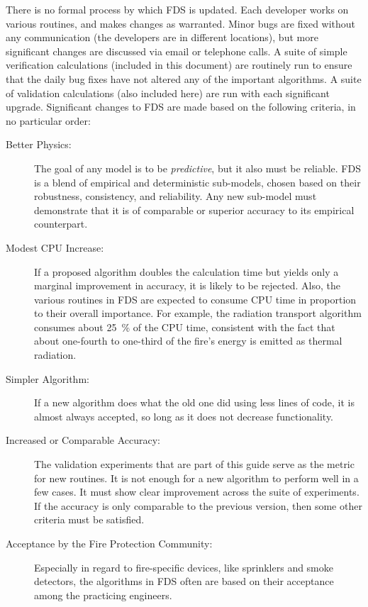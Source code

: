 \documentclass[11pt]{book}
\begin{document}
There is no formal process by which FDS is updated. Each developer
works on various routines, and makes changes as warranted. Minor bugs
are fixed without any communication (the developers are in different
locations), but more significant changes are discussed via email or
telephone calls. A suite of simple verification calculations (included
in this document) are routinely run to ensure that the daily bug fixes
have not altered any of the important algorithms. A suite of
validation calculations (also included here) are run with each
significant upgrade.
Significant changes to FDS are made based on the following criteria, in no particular order:
\begin{description}
\item[Better Physics:] The goal of any model is to be {\em predictive}, but it also must be reliable. FDS is a blend of empirical and
deterministic sub-models, chosen based on their robustness, consistency, and reliability. Any new sub-model must demonstrate that it is
of comparable or superior accuracy to its empirical counterpart.
\item[Modest CPU Increase:] If a proposed algorithm doubles the calculation time but yields only a marginal improvement in accuracy, it is
likely to be rejected. Also, the various routines in FDS are expected to consume CPU time in proportion to their overall importance. For example,
the radiation transport algorithm consumes about 25~\% of the CPU time, consistent with the fact that about one-fourth to one-third of the
fire's energy is emitted as thermal radiation.
\item[Simpler Algorithm:] If a new algorithm does what the old one did using less lines of code, it is almost always accepted, so long as
it does not decrease functionality.
\item[Increased or Comparable Accuracy:] The validation experiments that are part of this guide serve as the metric for new routines. It is
not enough for a new algorithm to perform well in a few cases. It must show clear improvement across the suite of experiments. If the
accuracy is only comparable to the previous version, then some other criteria must be satisfied.
\item[Acceptance by the Fire Protection Community:] Especially in regard to fire-specific devices, like sprinklers and smoke detectors, the
algorithms in FDS often are based on their acceptance among the practicing engineers.
\end{description}
\end{document}
